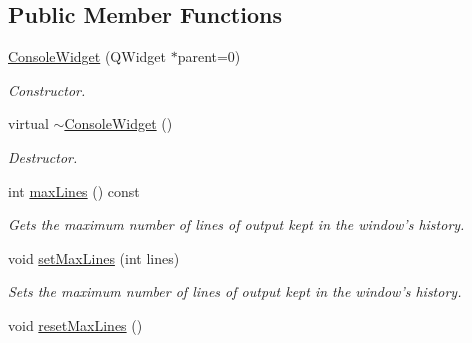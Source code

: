 \subsection*{Public Member Functions}
\begin{DoxyCompactItemize}
\item 
\hyperlink{class_console_widget_a4a66caaf3f7583a46ebe44a5c2221160}{Console\-Widget} (Q\-Widget $\ast$parent=0)
\begin{DoxyCompactList}\small\item\em Constructor. \end{DoxyCompactList}\item 
\hypertarget{class_console_widget_ad5eecd18eefd98df1f59da4499199523}{virtual \hyperlink{class_console_widget_ad5eecd18eefd98df1f59da4499199523}{$\sim$\-Console\-Widget} ()}\label{class_console_widget_ad5eecd18eefd98df1f59da4499199523}

\begin{DoxyCompactList}\small\item\em Destructor. \end{DoxyCompactList}\item 
int \hyperlink{class_console_widget_a1e01a4e339ff6781cbfec5bd59c292f6}{max\-Lines} () const 
\begin{DoxyCompactList}\small\item\em Gets the maximum number of lines of output kept in the window's history. \end{DoxyCompactList}\item 
void \hyperlink{class_console_widget_a5bb26af5e53e3025d31b40d8e284feb9}{set\-Max\-Lines} (int lines)
\begin{DoxyCompactList}\small\item\em Sets the maximum number of lines of output kept in the window's history. \end{DoxyCompactList}\item 
\hypertarget{class_console_widget_a58291752b182ad84572e36029c42e827}{void \hyperlink{class_console_widget_a58291752b182ad84572e36029c42e827}{reset\-Max\-Lines} ()}\label{class_console_widget_a58291752b182ad84572e36029c42e827}


\end{DoxyCompactItemize}
